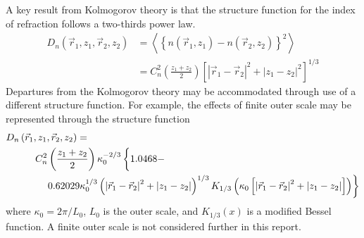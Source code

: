 A key result from Kolmogorov theory is that the structure function for the index of refraction follows a two-thirds power law.
\begin{equation}\label{eqn:kolmogorov}
\begin{aligned}
D_{n}\left(\vec{r}_{1}, z_{1}, \vec{r}_{2}, z_{2}\right) & = 
\left\langle \left\{n\left(\vec{r}_{1}, z_{1}\right) - n\left(\vec{r}_{2}, z_{2}\right)\right\}^{2} \right\rangle \\
& = 
C_{n}^{2}\left(\frac{z_{1} + z_{2}}{2}\right) \left[ \left\vert \vec{r}_{1} - \vec{r}_{2} \right\vert^{2} + \left\vert z_{1} - z_{2} \right\vert^{2}\right]^{1/3}
\end{aligned}
\end{equation}
Departures from the Kolmogorov theory may be accommodated through use
of a different structure function.  For example, the effects of finite 
outer scale may be represented through the structure function 
\begin{equation}
\begin{aligned}
&D_{n}\left(\vec{r}_{1}, z_{1}, \vec{r}_{2}, z_{2}\right) = \\
&\quad\quad\quad C_{n}^{2}\left(\frac{z_{1} + z_{2}}{2}\right) \kappa_{0}^{-2/3}
\left\{\vphantom{\left(\left\vert \vec{r}_{1} - \vec{r}_{2} \right\vert^{2} + \left\vert z_{1} - z_{2} \right\vert\right)^{1/3} }
1.0468 - \right.\\
&\quad\quad\quad\quad 
\left.
0.62029\kappa_{0}^{1/3}\left(\left\vert \vec{r}_{1} - \vec{r}_{2} \right\vert^{2} + \left\vert z_{1} - z_{2} \right\vert\right)^{1/3} 
K_{1/3}\left(\kappa_{0}\left[\left\vert \vec{r}_{1} - \vec{r}_{2} \right\vert^{2} + \left\vert z_{1} - z_{2} \right\vert\right]\right)\right\}
\end{aligned}
\end{equation}
where $\kappa_{0} = 2\pi / L_{0}$, $L_{0}$ is the outer scale, and
$K_{1/3}\left(x\right)$ is a modified Bessel
function\cite{sasiela2007electromagnetic}.  A finite outer scale is
not considered further in this report.

